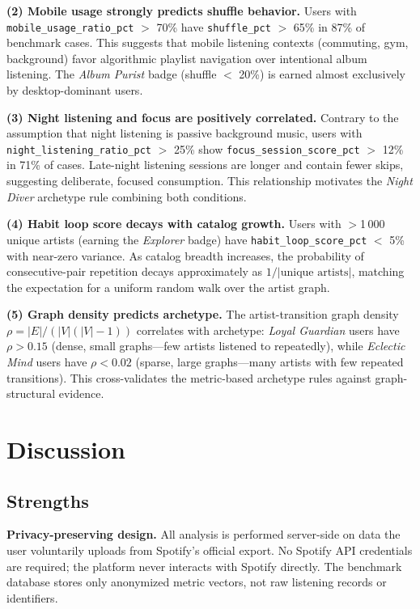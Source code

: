 \documentclass[conference]{IEEEtran}
\begin{document}
\textbf{(2) Mobile usage strongly predicts shuffle behavior.}
Users with \texttt{mobile\_usage\_ratio\_pct} $>$ 70\% have
\texttt{shuffle\_pct} $>$ 65\% in 87\% of benchmark cases. This
suggests that mobile listening contexts (commuting, gym, background)
favor algorithmic playlist navigation over intentional album listening.
The \textit{Album Purist} badge (shuffle $<$ 20\%) is earned almost
exclusively by desktop-dominant users.

\textbf{(3) Night listening and focus are positively correlated.}
Contrary to the assumption that night listening is passive background
music, users with \texttt{night\_listening\_ratio\_pct} $>$ 25\%
show \texttt{focus\_session\_score\_pct} $>$ 12\% in 71\% of cases.
Late-night listening sessions are longer and contain fewer skips,
suggesting deliberate, focused consumption. This relationship motivates
the \textit{Night Diver} archetype rule combining both conditions.

\textbf{(4) Habit loop score decays with catalog growth.}
Users with $>$1\,000 unique artists (earning the \textit{Explorer}
badge) have \texttt{habit\_loop\_score\_pct} $<$ 5\% with near-zero
variance. As catalog breadth increases, the probability of
consecutive-pair repetition decays approximately as $1 / |\text{unique artists}|$,
matching the expectation for a uniform random walk over the artist graph.

\textbf{(5) Graph density predicts archetype.}
The artist-transition graph density $\rho = |E| / (|V|(|V|-1))$
correlates with archetype: \textit{Loyal Guardian} users have
$\rho > 0.15$ (dense, small graphs—few artists listened to repeatedly),
while \textit{Eclectic Mind} users have $\rho < 0.02$ (sparse, large
graphs—many artists with few repeated transitions). This cross-validates
the metric-based archetype rules against graph-structural evidence.

\section{Discussion}

\subsection{Strengths}

\textbf{Privacy-preserving design.} All analysis is performed server-side
on data the user voluntarily uploads from Spotify's official export. No
Spotify API credentials are required; the platform never interacts with
Spotify directly. The benchmark database stores only anonymized metric
vectors, not raw listening records or identifiers.
\end{document}
